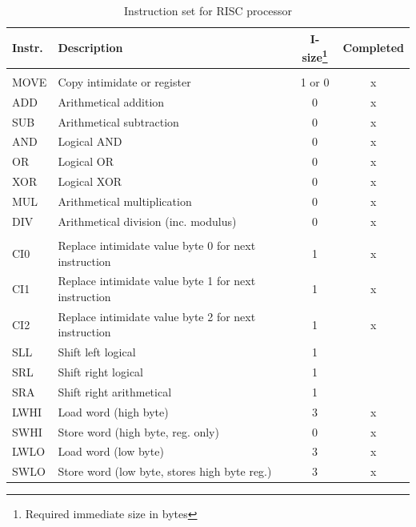 \documentclass[a4paper,12pt]{article}
\begin{document}
\begin{longtable}[h!]{| l | p{} | c | c |}
	\caption{Instruction set for RISC processor}
	\label{table:risc_instr}\\
	
	\hline 
	\rowcolor[rgb]{0.82,0.82,0.82}
	Instr. & Description & I-size\footnote{Required immediate size in bytes} & Completed \\\hline
	\endhead		
	
	\arrayrulecolor{black}\hline
	\endfoot

	\multicolumn{4}{|c|}{
		\cellcolor[rgb]{0.7,0.7,1}\textit{2 register instructions}} \\\hline
	\arrayrulecolor[rgb]{0.82,0.82,0.82}
	
	MOVE & Copy intimidate or register & 1 or 0 & x \\\hline
	ADD  & Arithmetical addition & 0 & x \\
	SUB  & Arithmetical subtraction & 0  & x \\
	AND  & Logical AND & 0 & x \\
	OR   & Logical OR & 0 & x \\
	XOR  & Logical XOR & 0 & x \\
	MUL  & Arithmetical multiplication & 0 & x \\
	DIV  & Arithmetical division (inc. modulus) & 0 & x \\
		

	\arrayrulecolor{black}\hline
	\multicolumn{4}{|c|}{
		\cellcolor[rgb]{0.7,0.7,1}\textit{1 register instructions}} \\
	\hline\arrayrulecolor[rgb]{0.82,0.82,0.82}
	
	CI0  & Replace intimidate value byte 0 for next instruction & 1 & x \\
	CI1  & Replace intimidate value byte 1 for next instruction & 1 & x \\
	CI2  & Replace intimidate value byte 2 for next instruction & 1 & x \\\hline
		
	SLL  & Shift left logical & 1 & \\
	SRL  & Shift right logical & 1 & \\
	SRA  & Shift right arithmetical & 1 & \\\hline
		
	LWHI & Load word (high byte) & 3 & x \\
	SWHI & Store word (high byte, reg. only) & 0 & x \\
	LWLO & Load word (low byte) & 3 & x \\
	SWLO & Store word (low byte, stores high byte reg.) & 3 & x \\\hline
		

\end{longtable}
\end{document}
